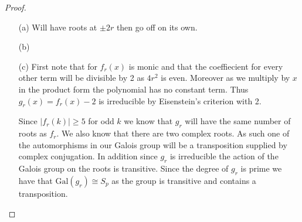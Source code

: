 \documentclass[10pt]{article}
\theoremstyle{plain}
\theoremstyle{remark}
\begin{document}
\begin{proof}
  \begin{enumerate}
  \item[(a)] Will have roots at $\pm 2r$ then go off on its own.
  \item[(b)] 
  \item[(c)] First note that for $f_r(x)$ is monic and that the coeffiecient
    for every other term will be divisible by 2 as $4r^2$ is even. Moreover
    as we multiply by $x$ in the product form the polynomial has no constant
    term. Thus $g_r(x)=f_r(x)-2$ is irreducible by Eisenstein's criterion with
    2.

    Since $|f_r(k)|\geq 5$ for odd $k$ we know that $g_r$ will have the same
    number of roots as $f_r$. We also know that there are two complex
    roots. As such one of the automorphisms in our Galois group will
    be a transposition supplied by complex conjugation. In addition since $g_r$
    is irreducible the action of the Galois group on the roots is transitive.
    Since the degree of $g_r$ is prime we have that $\text{Gal}(g_r)\cong S_p$
    as the group is transitive and contains a transposition.
  \end{enumerate}
\end{proof}

\end{document}
